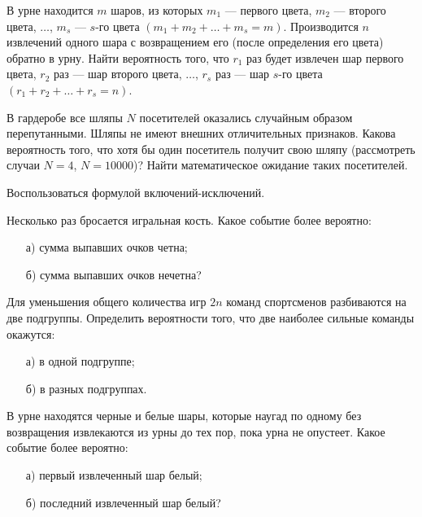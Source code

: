 \begin{problem}
В урне находится $m$ шаров, из которых $m_1$ --- первого цвета, $m_2$ --- второго цвета, $\ldots$, $m_s$ --- $s$-го цвета 
$(m_1+m_2+\ldots +m_s=m)$. 
Производится $n$ извлечений одного шара с возвращением его (после определения его цвета) обратно в урну. Найти вероятность того, 
что $r_1$ раз будет извлечен шар первого цвета, $r_2$ раз --- шар второго цвета, $\ldots$, $r_s$ раз --- шар $s$-го цвета 
$(r_1+r_2+\ldots +r_s=n)$. 
\end{problem}


\begin{problem}
В гардеробе все шляпы $N$ посетителей оказались случайным образом перепутанными. Шляпы не имеют внешних отличительных признаков. 
Какова вероятность того, что хотя бы один посетитель получит свою шляпу (рассмотреть случаи $N=4$, $N=10000$)? Найти математическое ожидание таких посетителей. 

\begin{ordre}
Воспользоваться формулой включений-исключений.
\end{ordre}

\end{problem}


\begin{problem}
Несколько раз бросается игральная кость. Какое событие более вероятно: 
\begin{enumerate}
\item[а)] сумма выпавших очков четна; 
\item[б)] сумма выпавших очков нечетна? 
\end{enumerate}
\end{problem}


\begin{problem}
Для уменьшения общего количества игр $2n$ команд спортсменов разбиваются на две подгруппы. Определить вероятности того, что 
две наиболее сильные команды окажутся: 
\begin{enumerate}
\item[а)] в одной подгруппе; 
\item[б)] в разных подгруппах. 
\end{enumerate}
\end{problem}


\begin{problem}
В урне находятся черные и белые шары, которые наугад по одному без возвращения извлекаются из урны до тех пор, пока урна не опустеет. 
Какое событие более вероятно: 
\begin{enumerate}
\item[а)] первый извлеченный шар белый; 
\item[б)] последний извлеченный шар белый? 
\end{enumerate}
\end{problem}



